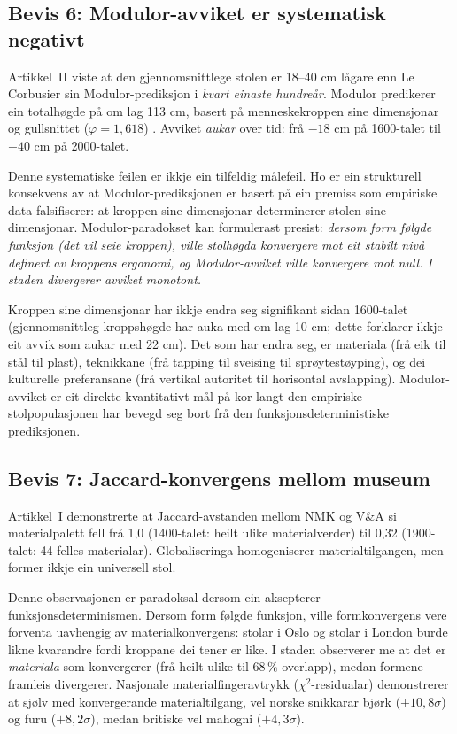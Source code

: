 \documentclass[10pt, a4paper, twocolumn]{article}
\begin{document}
\subsection{Bevis 6: Modulor-avviket er systematisk negativt}

Artikkel~II viste at den gjennomsnittlege stolen er 18--40 cm lågare enn Le Corbusier sin Modulor-prediksjon i \emph{kvart einaste hundreår}. Modulor predikerer ein totalhøgde på om lag 113 cm, basert på menneskekroppen sine dimensjonar og gullsnittet ($\varphi = 1{,}618$) \citep{lecorbusier1950}. Avviket \emph{aukar} over tid: frå $-18$ cm på 1600-talet til $-40$ cm på 2000-talet.

Denne systematiske feilen er ikkje ein tilfeldig målefeil. Ho er ein strukturell konsekvens av at Modulor-prediksjonen er basert på ein premiss som empiriske data falsifiserer: at kroppen sine dimensjonar determinerer stolen sine dimensjonar. Modulor-paradokset kan formulerast presist: \emph{dersom form følgde funksjon (det vil seie kroppen), ville stolhøgda konvergere mot eit stabilt nivå definert av kroppens ergonomi, og Modulor-avviket ville konvergere mot null. I staden divergerer avviket monotont.}

Kroppen sine dimensjonar har ikkje endra seg signifikant sidan 1600-talet (gjennomsnittleg kroppshøgde har auka med om lag 10 cm; dette forklarer ikkje eit avvik som aukar med 22 cm). Det som har endra seg, er materiala (frå eik til stål til plast), teknikkane (frå tapping til sveising til sprøytestøyping), og dei kulturelle preferansane (frå vertikal autoritet til horisontal avslapping). Modulor-avviket er eit direkte kvantitativt mål på kor langt den empiriske stolpopulasjonen har bevegd seg bort frå den funksjonsdeterministiske prediksjonen.


\subsection{Bevis 7: Jaccard-konvergens mellom museum}

Artikkel~I demonstrerte at Jaccard-avstanden mellom NMK og V\&A si materialpalett fell frå 1,0 (1400-talet: heilt ulike materialverder) til 0,32 (1900-talet: 44 felles materialar). Globaliseringa homogeniserer materialtilgangen, men former ikkje ein universell stol.

Denne observasjonen er paradoksal dersom ein aksepterer funksjonsdeterminismen. Dersom form følgde funksjon, ville formkonvergens vere forventa uavhengig av materialkonvergens: stolar i Oslo og stolar i London burde likne kvarandre fordi kroppane dei tener er like. I staden observerer me at det er \emph{materiala} som konvergerer (frå heilt ulike til 68\,\% overlapp), medan formene framleis divergerer. Nasjonale materialfingeravtrykk ($\chi^2$-residualar) demonstrerer at sjølv med konvergerande materialtilgang, vel norske snikkarar bjørk ($+10{,}8\sigma$) og furu ($+8{,}2\sigma$), medan britiske vel mahogni ($+4{,}3\sigma$).
\end{document}
